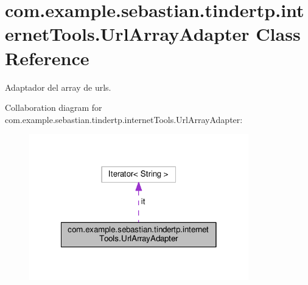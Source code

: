 \hypertarget{classcom_1_1example_1_1sebastian_1_1tindertp_1_1internetTools_1_1UrlArrayAdapter}{}\section{com.\+example.\+sebastian.\+tindertp.\+internet\+Tools.\+Url\+Array\+Adapter Class Reference}
\label{classcom_1_1example_1_1sebastian_1_1tindertp_1_1internetTools_1_1UrlArrayAdapter}


Adaptador del array de urls.  




Collaboration diagram for com.\+example.\+sebastian.\+tindertp.\+internet\+Tools.\+Url\+Array\+Adapter\+:\nopagebreak
\begin{figure}[H]
\begin{center}
\leavevmode
\includegraphics[width=270pt]{classcom_1_1example_1_1sebastian_1_1tindertp_1_1internetTools_1_1UrlArrayAdapter__coll__graph}
\end{center}
\end{figure}
